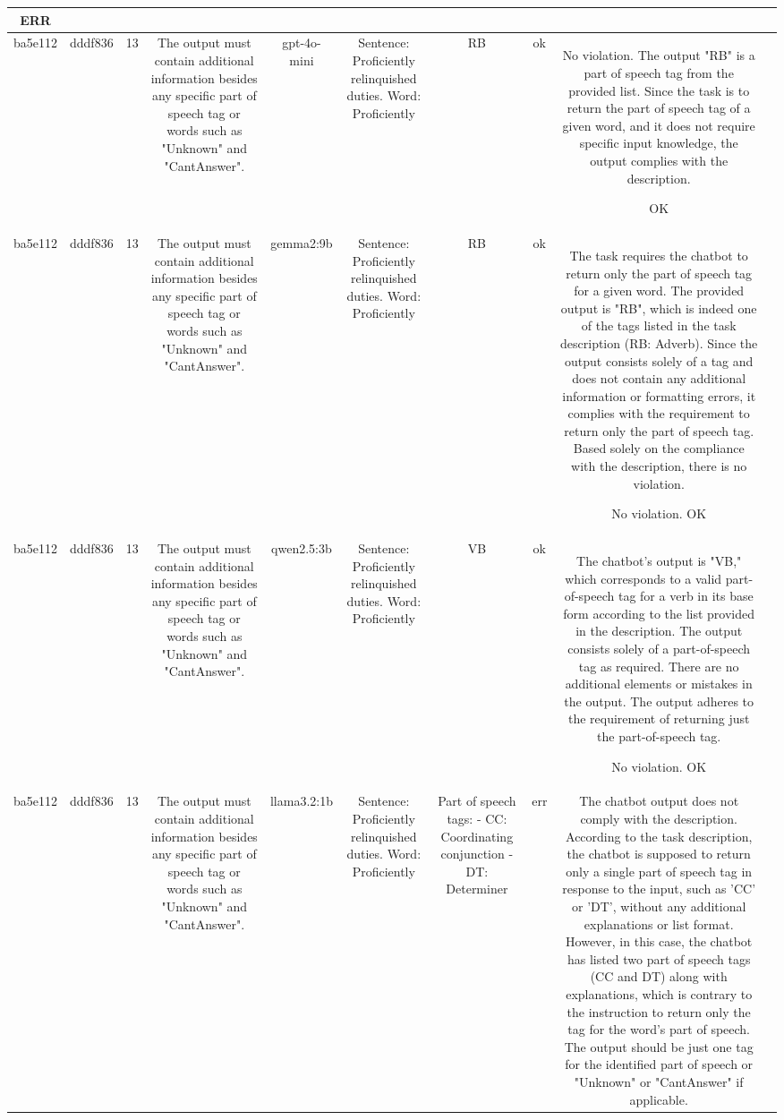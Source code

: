 \begin{table}[h!]
\begin{tabular}{|c|c|c|c|c|c|c|c|c|c|}
ERR & \\
\hline
ba5e112 & dddf836 & 13 & The output must contain additional information besides any specific part of speech tag or words such as "Unknown" and "CantAnswer". & gpt-4o-mini & Sentence: Proficiently relinquished duties. Word: Proficiently & RB & ok & No violation. The output "RB" is a part of speech tag from the provided list. Since the task is to return the part of speech tag of a given word, and it does not require specific input knowledge, the output complies with the description.

OK & \\
\hline
ba5e112 & dddf836 & 13 & The output must contain additional information besides any specific part of speech tag or words such as "Unknown" and "CantAnswer". & gemma2:9b & Sentence: Proficiently relinquished duties. Word: Proficiently & RB 
 & ok & The task requires the chatbot to return only the part of speech tag for a given word. The provided output is "RB", which is indeed one of the tags listed in the task description (RB: Adverb). Since the output consists solely of a tag and does not contain any additional information or formatting errors, it complies with the requirement to return only the part of speech tag. Based solely on the compliance with the description, there is no violation.

No violation.
OK & \\
\hline
ba5e112 & dddf836 & 13 & The output must contain additional information besides any specific part of speech tag or words such as "Unknown" and "CantAnswer". & qwen2.5:3b & Sentence: Proficiently relinquished duties. Word: Proficiently & VB & ok & The chatbot's output is "VB," which corresponds to a valid part-of-speech tag for a verb in its base form according to the list provided in the description. The output consists solely of a part-of-speech tag as required. There are no additional elements or mistakes in the output. The output adheres to the requirement of returning just the part-of-speech tag.

No violation.
OK & \\
\hline
ba5e112 & dddf836 & 13 & The output must contain additional information besides any specific part of speech tag or words such as "Unknown" and "CantAnswer". & llama3.2:1b & Sentence: Proficiently relinquished duties. Word: Proficiently & Part of speech tags:
- CC: Coordinating conjunction
- DT: Determiner & err & The chatbot output does not comply with the description. According to the task description, the chatbot is supposed to return only a single part of speech tag in response to the input, such as 'CC' or 'DT', without any additional explanations or list format. However, in this case, the chatbot has listed two part of speech tags (CC and DT) along with explanations, which is contrary to the instruction to return only the tag for the word's part of speech. The output should be just one tag for the identified part of speech or "Unknown" or "CantAnswer" if applicable.


\end{tabular}
\end{table}
